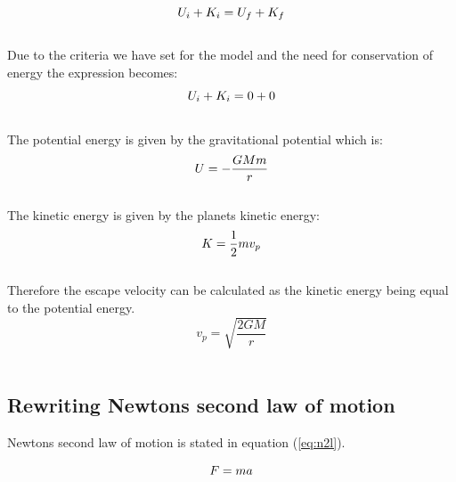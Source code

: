\documentclass{article}
\begin{document}
    \begin{equation}    \label{eq:U=K}
        U_i + K_i = U_f + K_f \\
    \end{equation} \\

    Due to the criteria we have set for the model and the need for conservation of energy the expression becomes: \\

    \begin{equation}    \label{eq:Kwithfinalas0}
        U_i + K_i = 0 + 0 \\
    \end{equation} \\

    The potential energy is given by the gravitational potential which is:\\

    \begin{equation}    \label{eq:gravitationalpotential}
        U = - \frac{GMm}{r} \\
    \end{equation} \\

    The kinetic energy is given by the planets kinetic energy: \\

    \begin{equation}    \label{eq:kineticpotential}
        K = \frac{1}{2} mv_p \\
    \end{equation} \\

    Therefore the escape velocity can be calculated as the kinetic energy being equal to the potential energy. \\

    \begin{equation} \label{eq:escapevelocity}
        v_p =  \sqrt{\frac{2GM}{r}}
    \end{equation} \\

\subsection{Rewriting Newtons second law of motion} \label{sec:n2l}

    Newtons second law of motion is stated in equation (\ref{eq:n2l}).

    \begin{equation} \label{eq:n2l}
        F = ma \\
    \end{equation} \\
\end{document}
